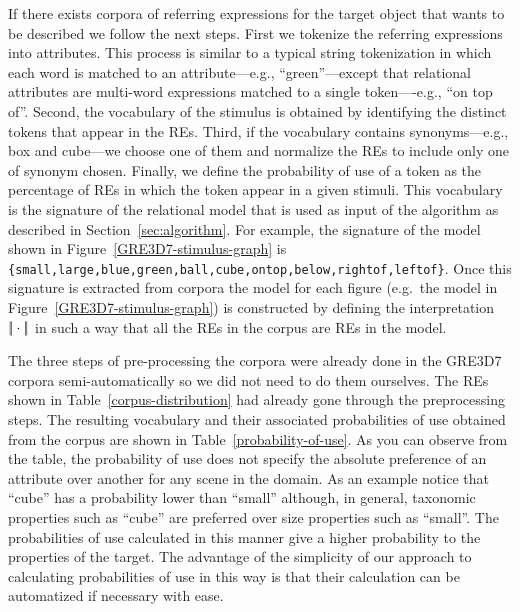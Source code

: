 If there exists corpora of referring expressions for the target object that wants to be described we follow the next steps. First we tokenize the referring expressions into attributes. This process is similar to a typical string tokenization in which each word is matched to an attribute---e.g., ``green''---except that relational attributes are multi-word expressions matched to a single token----e.g., ``on top of''. Second, the vocabulary of the stimulus is obtained by identifying the distinct tokens that appear in the REs. Third, if the vocabulary contains synonyms---e.g., box and cube---we choose one of them and normalize the REs to include only one of synonym chosen. Finally, we define the probability of use of a token as the percentage of REs in which the token appear in a given stimuli. This vocabulary is the signature of the relational model that is used as input of the algorithm as described in Section~\ref{sec:algorithm}. For example, the signature of the model shown in Figure~\ref{GRE3D7-stimulus-graph} is \texttt{\{small,large,blue,green,ball,cube,ontop,below,rightof,leftof\}}. Once this signature is extracted from corpora the model for each figure (e.g.~the model in Figure~\ref{GRE3D7-stimulus-graph}) is constructed by defining the interpretation $|\!|\cdot|\!|$ in such a way that all the REs in the corpus are REs in the model. 

The three steps of pre-processing the corpora were already done in the GRE3D7 corpora semi-automatically so we did not need to do them ourselves. The REs shown in Table~\ref{corpus-distribution} had already gone through the preprocessing steps. The resulting vocabulary and their associated probabilities of use obtained from the corpus are shown in Table~\ref{probability-of-use}. As you can observe from the table, the probability of use does not specify the absolute preference of an attribute over another for any scene in the domain. As an example notice that ``cube'' has a probability lower than ``small'' although, in general, taxonomic properties such as ``cube'' are preferred over size properties such as ``small''. The probabilities of use calculated in this manner give a higher probability to the properties of the target. The advantage of the simplicity of our approach to calculating probabilities of use in this way is that their calculation can be automatized if necessary with ease. 

